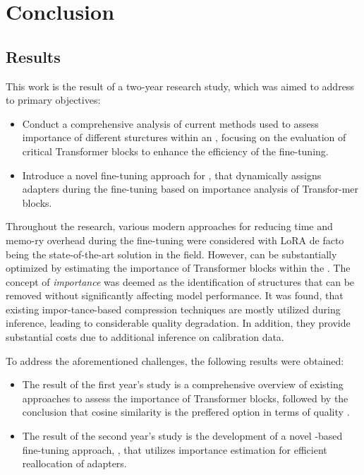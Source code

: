 \section*{Conclusion}
\setcounter{subsection}{0}
\subsection{Results}
    This work is the result of a two-year research study, which was aimed to address to primary objectives:
    \begin{itemize}
        \item Conduct a comprehensive analysis of current methods used to assess importance of different sturctures within an \llm{}, focusing on the evaluation of critical Transformer blocks to enhance the efficiency of the fine-tuning.
        \item Introduce a novel fine-tuning approach for \llms{}, that dynamically assigns \lora{} adapters during the fine-tuning based on importance analysis of Transfor-mer blocks.
    \end{itemize}

    Throughout the research, various modern approaches for reducing time and memo-ry overhead during the fine-tuning were considered with LoRA de facto being the state-of-the-art solution in the field. However, \lora{} can be substantially optimized by estimating the importance of Transformer blocks within the \llm{}. The concept of \textit{importance} was deemed as the identification of structures that can be removed without significantly affecting model performance. It was found, that existing impor-tance-based compression techniques are mostly utilized during inference, leading to considerable quality degradation. In addition, they provide substantial costs due to additional inference on calibration data.


    To address the aforementioned challenges, the following results were obtained:
    \begin{itemize}
        \item The result of the first year's study is a comprehensive overview of existing approaches to assess the importance of Transformer blocks, followed by the conclusion that cosine similarity is the preffered option in terms of quality \cite{Novikova2026}.
        \item The result of the second year's study is the development of a novel \lora{}-based fine-tuning approach, \ourmethodshort{}, that utilizes importance estimation for efficient reallocation of \lora{} adapters.
    \end{itemize}

